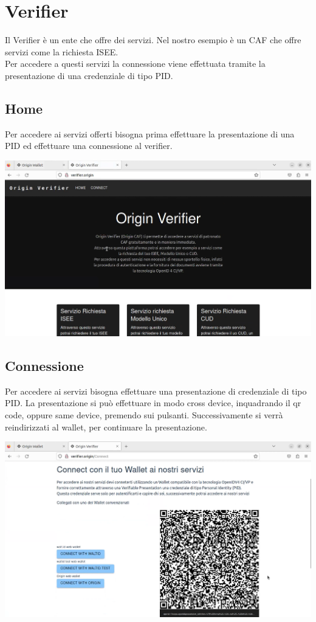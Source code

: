 \section{Verifier}
Il Verifier è un ente che offre dei servizi. Nel nostro esempio è un CAF che offre servizi come la richiesta ISEE.\\
Per accedere a questi servizi la connessione viene effettuata tramite la presentazione di una credenziale di tipo PID.
\subsection{Home}
Per accedere ai servizi offerti bisogna prima effettuare la presentazione di una PID ed effettuare una connessione al verifier.
\begin{center}
    \includegraphics[scale = 0.2]{./res/img/verifier/new/verifier_connect.png}
\end{center}

\subsection{Connessione}
Per accedere ai servizi bisogna effettuare una presentazione di credenziale di tipo PID. La presentazione si può effettuare in modo cross device, inquadrando il qr code, oppure same device, premendo sui pulsanti. Successivamente si verrà reindirizzati al wallet, per continuare la presentazione.
\begin{center}
\includegraphics[scale = 0.2]{./res/img/verifier/new/verifier_qr.png}
\end{center}

